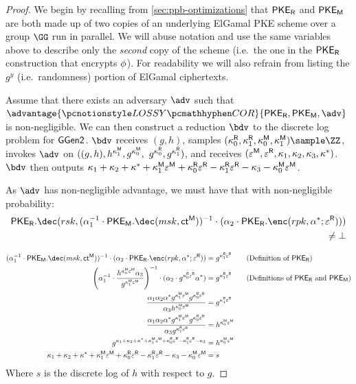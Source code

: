 \begin{proof}
	We begin by recalling from \cref{sec:ppb-optimizations} that ${{\mathsf{PKE}_{{\mathsf{R}}}}}$ and ${{\mathsf{PKE}_{{\mathsf{M}}}}}$ are both made up of two copies of an underlying ElGamal PKE scheme over a group $\group$ run in parallel.
	We will abuse notation and use the same variables above to describe only the \emph{second} copy of the scheme (i.e.\ the one in the ${{\mathsf{PKE}_{{\mathsf{R}}}}}$ construction that encrypts $\phi$).
	For readability we will also refrain from listing the $g^y$ (i.e.\ randomness) portion of ElGamal ciphertexts.

	Assume that there exists an adversary $\adv$ such that $\advantage{\badcorgame}{\pker, \pkem,  \adv}$ is non-negligible.
	We can then construct a reduction $\bdv$ to the discrete log problem for $\mathsf{GGen2}$.
	$\bdv$ receives $(g, h)$, samples $(\rkgr_0, \rkgr_1, \mkgr_0, \mkgr_1) \sample \Z$, invokes $\adv$ on $((g, h), h^{\kappa^{{{\mathsf{M}}}}_1}, g^{\kappa^{{{\mathsf{M}}}}_0},$ $g^{\kappa^{{{\mathsf{R}}}}_0}, g^{\kappa^{{{\mathsf{R}}}}_1})$, and receives $(\varepsilon^{{\mathsf{M}}}, \varepsilon^{{\mathsf{R}}}, \kappa_1, \kappa_2, \kappa_3, \kappa^*)$.
	$\bdv$ then outputs $\kappa_1 + \kappa_2 + \kappa^* + \kappa^{{{\mathsf{M}}}}_1\varepsilon^{{\mathsf{M}}} + \kappa^{{{\mathsf{R}}}}_0\varepsilon^{{\mathsf{R}}} - \kappa^{{{\mathsf{R}}}}_1\varepsilon^{{\mathsf{R}}} - \kappa_3 - \kappa^{{{\mathsf{M}}}}_0\varepsilon^{{\mathsf{M}}}$.

	As $\adv$ has non-negligible advantage, we must have that with non-negligible probability:
	\begin{align*}
		\pker.\dec(\revsk, (\otpk_1^{-1} \cdot \pkem.\dec(\matsk, \matct))^{-1} \cdot (\otpk_2 \cdot \pker.\enc(\revpk, \otpk^*; \rencr))) & \\
		\neq \bot                                                                                                                          &
	\end{align*}

	\vspace{-2em}
	\begin{align*}
		(\otpk_1^{-1} \cdot \pkem.\dec(\matsk, \matct))^{-1} \cdot (\otpk_2 \cdot \pker.\enc(\revpk, \otpk^*; \rencr))                      & = g^{\rkgrB\rencr} \tag{Definition of $\pker$}              \\
		\left(\otpk_1^{-1} \cdot \frac{h^{\mkglr\mencr}\otpk_3}{g^{\mkgir\mencr}}\right)^{-1} \cdot (\otpk_2 \cdot g^{\rkgrA\rencr}\otpk^*) & = g^{\rkgrB\rencr} \tag{Definitions of $\pker$ and $\pkem$} \\
		\frac{\otpk_1\otpk_2\otpk^* g^{\mkgir\mencr}g^{\rkgrA\rencr}}{\otpk_3h^{\mkglr\mencr}}                                              & = g^{\rkgrB\rencr}                                          \\
		\frac{\otpk_1\otpk_2\otpk^* g^{\mkgir\mencr}g^{\rkgrA\rencr}}{\otpk_3g^{\rkgrB\rencr}}                                              & = h^{\mkglr\mencr}                                          \\
		g^{\okgrA + \okgrB + \okgrD + \mkgir\mencr + \rkgrA\rencr - \rkgrB\rencr - \okgrC}                                                  & = h^{\mkglr\mencr}                                          \\
		\okgrA + \okgrB + \okgrD + \mkgir\mencr + \rkgrA\rencr - \rkgrB\rencr - \okgrC - \mkglr\mencr                                       & = s
	\end{align*}
	Where $s$ is the discrete log of $h$ with respect to $g$.


\end{proof}
